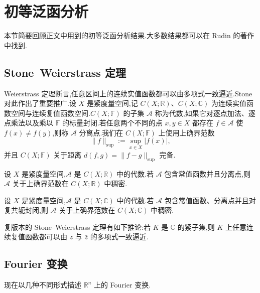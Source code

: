 \section{初等泛函分析}\label{app:sec:elementary-functional-analysis}

本节简要回顾正文中用到的初等泛函分析结果.大多数结果都可以在 Rudin 的著作 \cite{RudinReal,RudinFunctional} 中找到.

\subsection{Stone--Weierstrass 定理}

Weierstrass 定理断言,任意区间上的连续实值函数都可以由多项式一致逼近.Stone 对此作出了重要推广.设 \(X\) 是紧度量空间,记 \(C(X;\mathbb R)\)、\(C(X;\mathbb C)\) 为连续实值函数空间与连续复值函数空间.\(C(X;\mathbb F)\) 的子集 \(\mathcal A\) 称为代数,如果它对逐点加法、逐点乘法以及乘以 \(\mathbb F\) 的标量封闭.若任意两个不同的点 \(x,y\in X\) 都存在 \(f\in\mathcal A\) 使 \(f(x)\ne f(y)\),则称 \(\mathcal A\) 分离点.我们在 \(C(X;\mathbb F)\) 上使用上确界范数
\[
\|f\|_{\mathrm{sup}}:=\sup_{x\in X}|f(x)|,
\]
并且 \(C(X;\mathbb F)\) 关于距离 \(d(f,g)=\|f-g\|_{\mathrm{sup}}\) 完备.

\begin{theorem}\label{app:thm:stone-real}
设 \(X\) 是紧度量空间,\(\mathcal A\) 是 \(C(X;\mathbb R)\) 中的代数.若 \(\mathcal A\) 包含常值函数并且分离点,则 \(\mathcal A\) 关于上确界范数在 \(C(X;\mathbb R)\) 中稠密.
\end{theorem}

\begin{theorem}\label{app:thm:stone-complex}
设 \(X\) 是紧度量空间,\(\mathcal A\) 是 \(C(X;\mathbb C)\) 中的代数.若 \(\mathcal A\) 包含常值函数、分离点并且对复共轭封闭,则 \(\mathcal A\) 关于上确界范数在 \(C(X;\mathbb C)\) 中稠密.
\end{theorem}

复版本的 Stone--Weierstrass 定理有如下推论:若 \(K\) 是 \(\mathbb C\) 的紧子集,则 \(K\) 上任意连续复值函数都可以由 \(z\) 与 \(\bar z\) 的多项式一致逼近.

\subsection{Fourier 变换}\label{app:subsec:fourier-transform}

现在以几种不同形式描述 \(\mathbb R^n\) 上的 Fourier 变换.

